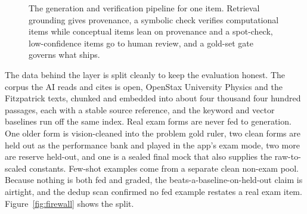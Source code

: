 \documentclass[11pt]{article}
\begin{document}
\begin{figure}[t]
\centering
{}
\caption{The generation and verification pipeline for one item. Retrieval grounding gives
provenance, a symbolic check verifies computational items while conceptual items lean on
provenance and a spot-check, low-confidence items go to human review, and a gold-set gate
governs what ships.}
\label{fig:rag}
\end{figure}

The data behind the layer is split cleanly to keep the evaluation honest. The corpus
the AI reads and cites is open, OpenStax University Physics and the Fitzpatrick texts,
chunked and embedded into about four thousand four hundred passages, each with a stable
source reference, and the keyword and vector baselines run off the same index. Real
exam forms are never fed to generation. One older form is vision-cleaned into the
problem gold ruler, two clean forms are held out as the performance bank and played in
the app's exam mode, two more are reserve held-out, and one is a sealed final mock that
also supplies the raw-to-scaled constants. Few-shot examples come from a separate clean
non-exam pool. Because nothing is both fed and graded, the beats-a-baseline-on-held-out
claim is airtight, and the dedup scan confirmed no fed example restates a real exam item.
Figure~\ref{fig:firewall} shows the split.
\end{document}
